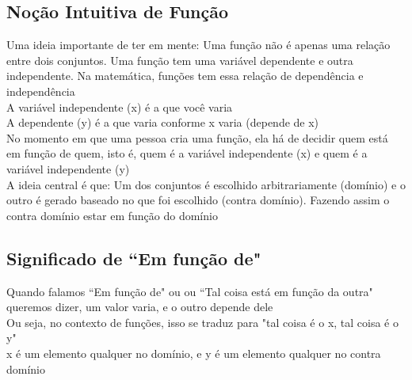 \documentclass{article}
\begin{document}
\subsection{Noção Intuitiva de Função}
Uma ideia importante de ter em mente: Uma função não é apenas uma relação entre dois conjuntos. Uma função tem uma variável dependente e outra independente. Na matemática, funções tem essa relação de dependência e independência 
\\[2pt]
A variável independente (x) é a que você varia 
\\[2pt]
A dependente (y) é a que varia conforme x varia (depende de x)
\\[5pt]
No momento em que uma pessoa cria uma função, ela há de decidir quem está em função de quem, isto é, quem é a variável independente (x) e quem é a variável independente (y)
\\[5pt]
A ideia central é que: Um dos conjuntos é escolhido arbitrariamente (domínio) e o outro é gerado baseado no que foi escolhido (contra domínio). Fazendo assim o contra domínio estar em função do domínio

\subsection{Significado de ``Em função de"}
Quando falamos ``Em função de" ou ou ``Tal coisa está em função da outra" queremos dizer, um valor varia, e o outro depende dele
\\[2pt]
Ou seja, no contexto de funções, isso se traduz para "tal coisa é o x, tal coisa é o y"
\\[2pt]
x é um elemento qualquer no domínio, e y é um elemento qualquer no contra domínio
\end{document}
